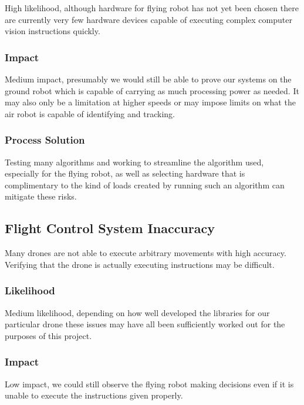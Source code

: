 \documentclass{article}
\begin{document}
		High likelihood, although hardware for flying robot has not yet been chosen there are currently very few hardware devices capable of executing complex computer vision instructions quickly. 
		
		\subsubsection{Impact}
		
		Medium impact, presumably we would still be able to prove our systems on the ground robot which is capable of carrying as much processing power as needed. It may also only be a limitation at higher speeds or may impose limits on what the air robot is capable of identifying and tracking. 
		
		\subsubsection{Process Solution}
		
		Testing many algorithms and working to streamline the algorithm used, especially for the flying robot, as well as selecting hardware that is complimentary to the kind of loads created by running such an algorithm can mitigate these risks. 
	
	\subsection{Flight Control System Inaccuracy}
	
	Many drones are not able to execute arbitrary movements with high accuracy. Verifying that the drone is actually executing instructions may be difficult. 
	
		\subsubsection{Likelihood}
		
		Medium likelihood, depending on how well developed the libraries for our particular drone these issues may have all been sufficiently worked out for the purposes of this project.
		
		\subsubsection{Impact}
		
		Low impact, we could still observe the flying robot making decisions even if it is unable to execute the instructions given properly.
		
\end{document}
